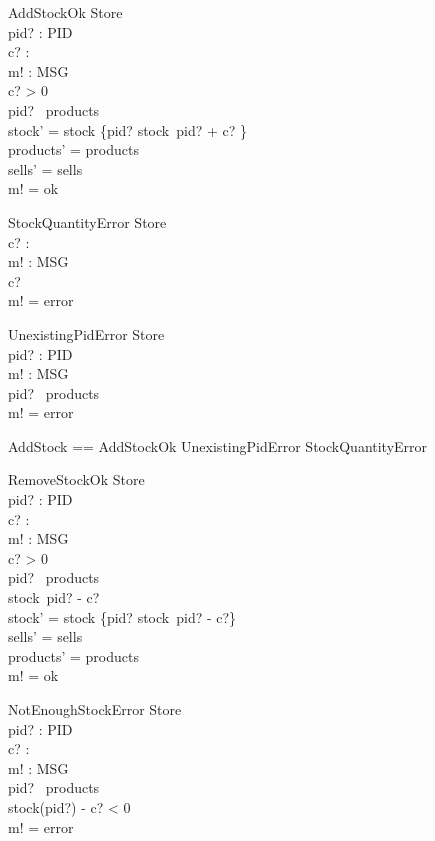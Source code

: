 \begin{schema}{AddStockOk}
\Delta Store \\
pid? : PID \\
c? : \nat \\
m! : MSG \\
\where
c? > 0 \\
pid? \in \dom~products \\
stock' = stock \oplus \{pid? \mapsto stock~pid? + c? \} \\
products' = products \\
sells' = sells \\
m! = ok
\end{schema}

\begin{schema}{StockQuantityError}
\Xi Store \\
c? : \nat \\
m! : MSG \\
\where
c?  \\
m! = error
\end{schema}

\begin{schema}{UnexistingPidError}
\Xi Store \\
pid? : PID \\
m! : MSG \\
\where
pid? \notin \dom~products \\
m! = error
\end{schema}

\begin{zed} 
AddStock == AddStockOk \lor UnexistingPidError \lor StockQuantityError
\end{zed}

\begin{schema}{RemoveStockOk}
\Delta Store \\
pid? : PID \\
c? : \nat \\
m! : MSG \\
\where
c? > 0 \\
pid? \in \dom~products \\
stock~pid? - c?   \\
stock' = stock \oplus \{pid? \mapsto stock~pid? - c?\} \\
sells' = sells \\
products' = products \\
m! = ok
\end{schema}

\begin{schema}{NotEnoughStockError}
\Xi Store \\
pid? : PID \\
c? : \nat \\
m! : MSG \\
\where
pid? \in \dom~products \\
stock(pid?) - c? < 0 \\
m! = error
\end{schema}

